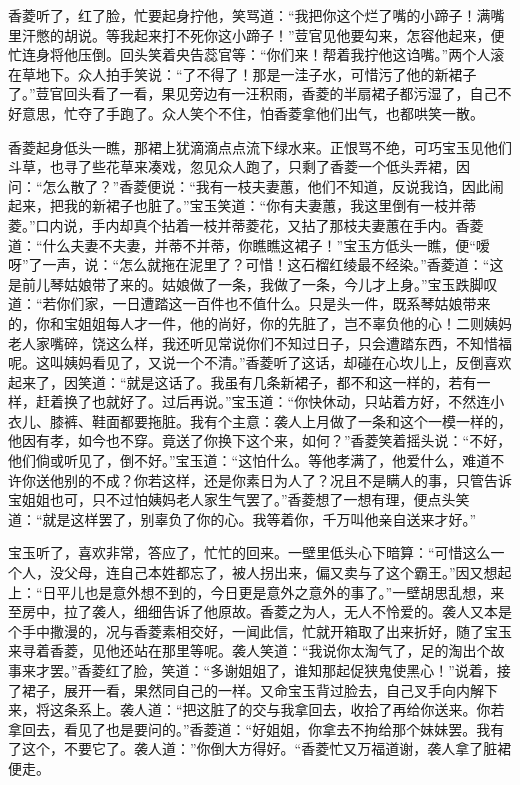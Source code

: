 \documentclass[12pt,oneside]{book}
\begin{document}
香菱听了，红了脸，忙要起身拧他，笑骂道：“我把你这个烂了嘴的小蹄子！满嘴里汗憋的胡说。等我起来打不死你这小蹄子！”荳官见他要勾来，怎容他起来，便忙连身将他压倒。回头笑着央告蕊官等：“你们来！帮着我拧他这诌嘴。”两个人滚在草地下。众人拍手笑说：“了不得了！那是一洼子水，可惜污了他的新裙子了。”荳官回头看了一看，果见旁边有一汪积雨，香菱的半扇裙子都污湿了，自己不好意思，忙夺了手跑了。众人笑个不住，怕香菱拿他们出气，也都哄笑一散。

香菱起身低头一瞧，那裙上犹滴滴点点流下绿水来。正恨骂不绝，可巧宝玉见他们斗草，也寻了些花草来凑戏，忽见众人跑了，只剩了香菱一个低头弄裙，因问：“怎么散了？”香菱便说：“我有一枝夫妻蕙，他们不知道，反说我诌，因此闹起来，把我的新裙子也脏了。”宝玉笑道：“你有夫妻蕙，我这里倒有一枝并蒂菱。”口内说，手内却真个拈着一枝并蒂菱花，又拈了那枝夫妻蕙在手内。香菱道：“什么夫妻不夫妻，并蒂不并蒂，你瞧瞧这裙子！”宝玉方低头一瞧，便“嗳呀”了一声，说：“怎么就拖在泥里了？可惜！这石榴红绫最不经染。”香菱道：“这是前儿琴姑娘带了来的。姑娘做了一条，我做了一条，今儿才上身。”宝玉跌脚叹道：“若你们家，一日遭踏这一百件也不值什么。只是头一件，既系琴姑娘带来的，你和宝姐姐每人才一件，他的尚好，你的先脏了，岂不辜负他的心！二则姨妈老人家嘴碎，饶这么样，我还听见常说你们不知过日子，只会遭踏东西，不知惜福呢。这叫姨妈看见了，又说一个不清。”香菱听了这话，却碰在心坎儿上，反倒喜欢起来了，因笑道：“就是这话了。我虽有几条新裙子，都不和这一样的，若有一样，赶着换了也就好了。过后再说。”宝玉道：“你快休动，只站着方好，不然连小衣儿、膝裤、鞋面都要拖脏。我有个主意：袭人上月做了一条和这个一模一样的，他因有孝，如今也不穿。竟送了你换下这个来，如何？”香菱笑着摇头说：“不好，他们倘或听见了，倒不好。”宝玉道：“这怕什么。等他孝满了，他爱什么，难道不许你送他别的不成？你若这样，还是你素日为人了？况且不是瞒人的事，只管告诉宝姐姐也可，只不过怕姨妈老人家生气罢了。”香菱想了一想有理，便点头笑道：“就是这样罢了，别辜负了你的心。我等着你，千万叫他亲自送来才好。”

宝玉听了，喜欢非常，答应了，忙忙的回来。一壁里低头心下暗算：“可惜这么一个人，没父母，连自己本姓都忘了，被人拐出来，偏又卖与了这个霸王。”因又想起上：“日平儿也是意外想不到的，今日更是意外之意外的事了。”一壁胡思乱想，来至房中，拉了袭人，细细告诉了他原故。香菱之为人，无人不怜爱的。袭人又本是个手中撒漫的，况与香菱素相交好，一闻此信，忙就开箱取了出来折好，随了宝玉来寻着香菱，见他还站在那里等呢。袭人笑道：“我说你太淘气了，足的淘出个故事来才罢。”香菱红了脸，笑道：“多谢姐姐了，谁知那起促狭鬼使黑心！”说着，接了裙子，展开一看，果然同自己的一样。又命宝玉背过脸去，自己叉手向内解下来，将这条系上。袭人道：“把这脏了的交与我拿回去，收拾了再给你送来。你若拿回去，看见了也是要问的。”香菱道：“好姐姐，你拿去不拘给那个妹妹罢。我有了这个，不要它了。袭人道：”你倒大方得好。“香菱忙又万福道谢，袭人拿了脏裙便走。
\end{document}
